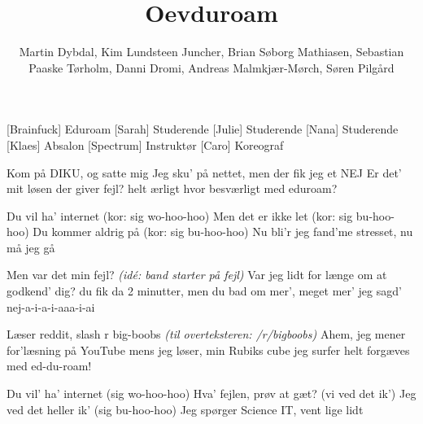 \documentclass[a4paper,11pt]{article}
\title{Oevduroam}
\author{Martin Dybdal, Kim Lundsteen Juncher, Brian
  Søborg Mathiasen, Sebastian Paaske Tørholm, Danni Dromi, Andreas
  Malmkjær-Mørch, Søren Pilgård}
\begin{document}
 \maketitle

 \begin{roles}
   [Brainfuck] Eduroam
   [Sarah] Studerende
   [Julie] Studerende
   [Nana] Studerende
   [Klaes] Absalon
   [Spectrum] Instruktør
   [Caro] Koreograf
 \end{roles}

 \begin{props}
 \end{props}

\begin{song}

%
  Kom på DIKU, og satte mig
  Jeg sku' på nettet, men der fik jeg et NEJ
  Er det' mit løsen der giver fejl?
  helt ærligt hvor besværligt med eduroam?


%
  Du vil ha' internet (kor: sig wo-hoo-hoo)
  Men det er ikke let (kor: sig bu-hoo-hoo)
  Du kommer aldrig på (kor: sig bu-hoo-hoo)
  Nu bli'r jeg fand'me stresset, nu må jeg gå


%
  Men var det min fejl? \textit{(idé: band starter på fejl)}
  Var jeg lidt for længe om at godkend' dig?
  du fik da 2 minutter, men du bad om mer', meget mer'
  jeg sagd' nej-a-i-a-i-aaa-i-ai

%
  Læser reddit, slash r big-boobs \textit{(til overteksteren: /r/bigboobs)}
  Ahem, jeg mener for'læsning på YouTube 
  mens jeg løser, min Rubiks cube
  jeg surfer helt forgæves med ed-du-roam!


%
  Du vil' ha' internet (sig wo-hoo-hoo)
  Hva' fejlen, prøv at gæt? (vi ved det ik')
  Jeg ved det heller ik' (sig bu-hoo-hoo)
  Jeg spørger Science IT, vent lige lidt


\end{song}
\end{document}
